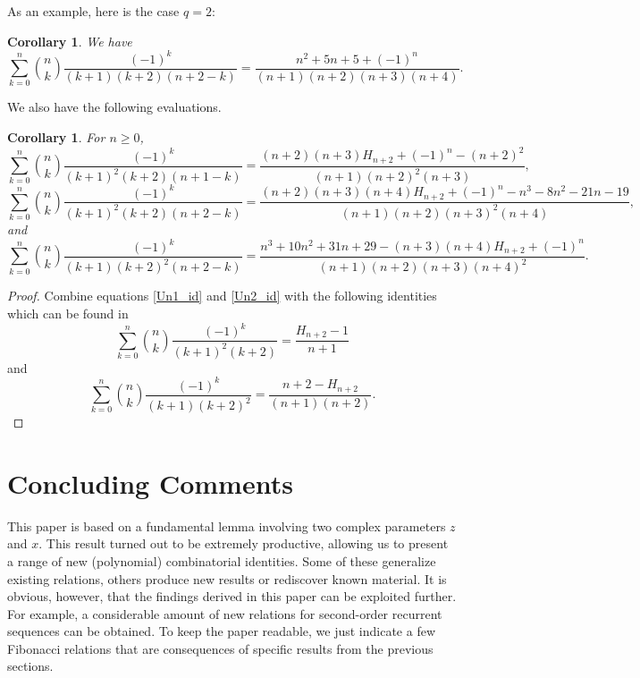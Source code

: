 \documentclass[11pt,reqno]{amsart}
\theoremstyle{plain}
\numberwithin{equation}{section}
\newtheorem{corollary}[thm]{Corollary}
\begin{document}
As an example, here is the case $q=2$:
\begin{corollary}
We have
\begin{equation}\label{Un2_id}
\sum_{k=0}^n \binom{n}{k} \frac{(-1)^{k}}{(k+1)(k+2)(n+2-k)} = \frac{n^2+5n+5+(-1)^n}{(n+1)(n+2)(n+3)(n+4)}.
\end{equation}
\end{corollary}

We also have the following evaluations.

\begin{corollary}
For $n\geq 0$,
\begin{equation}
\sum_{k=0}^n \binom{n}{k} \frac{(-1)^{k}}{(k+1)^2(k+2)(n+1-k)} = \frac{(n+2)(n+3)H_{n+2} + (-1)^n - (n+2)^2}{(n+1)(n+2)^2(n+3)},
\end{equation}
\begin{equation}
\sum_{k=0}^n \binom{n}{k} \frac{(-1)^{k}}{(k+1)^2(k+2)(n+2-k)} 
= \frac{(n+2)(n+3)(n+4)H_{n+2} + (-1)^n - n^3-8n^2-21n-19 }{(n+1)(n+2)(n+3)^2(n+4)},
\end{equation}
and
\begin{equation}
\sum_{k=0}^n \binom{n}{k} \frac{(-1)^{k}}{(k+1)(k+2)^2(n+2-k)} 
= \frac{n^3+10n^2+31n+29 - (n+3)(n+4)H_{n+2} + (-1)^n}{(n+1)(n+2)(n+3)(n+4)^2}.
\end{equation}
\end{corollary}
\begin{proof}
Combine equations \eqref{Un1_id} and \eqref{Un2_id} with the following identities which can be found in 
\cite[Eqs. (4.20) and (4.(21)]{Adegoke25}
$$\sum_{k=0}^n \binom{n}{k} \frac{(-1)^{k}}{(k+1)^2(k+2)} =\frac{H_{n+2}-1}{n+1}$$
and
$$\sum_{k=0}^n \binom{n}{k} \frac{(-1)^{k}}{(k+1)(k+2)^2} =\frac{n+2-H_{n+2}}{(n+1)(n+2)}.$$
\end{proof}


\section{Concluding Comments}

This paper is based on a fundamental lemma involving two complex parameters $z$ and $x$. This result turned out to be extremely productive,
allowing us to present a range of new (polynomial) combinatorial identities. Some of these generalize existing relations, others produce new results or rediscover known material. It is obvious, however, that the findings derived in this paper can be exploited further. For example, a considerable amount of new relations for second-order recurrent sequences can be obtained. To keep the paper readable, we just indicate a few Fibonacci relations that are consequences of specific results from the previous sections. \\
\end{document}
